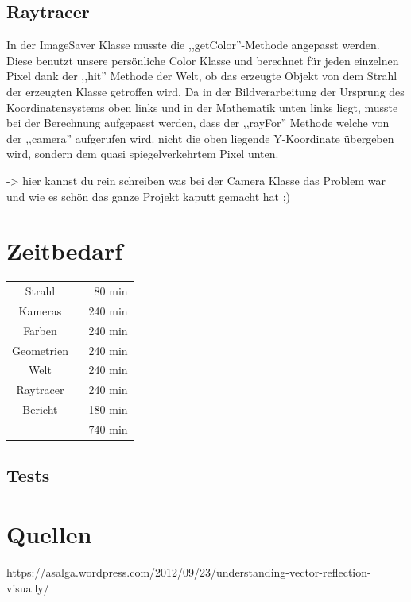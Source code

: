 \documentclass[14pt]{extarticle}
\begin{document}
\subsection{Raytracer}

In der ImageSaver Klasse musste die ,,getColor''-Methode angepasst werden. Diese benutzt unsere persönliche Color Klasse und berechnet für jeden einzelnen Pixel dank der ,,hit'' Methode der Welt, ob das erzeugte Objekt von dem Strahl der erzeugten Klasse getroffen wird. Da in der Bildverarbeitung der Ursprung des Koordinatensystems oben links und in der Mathematik unten links liegt, musste bei der Berechnung aufgepasst werden, dass der ,,rayFor'' Methode welche von der ,,camera'' aufgerufen wird. nicht die oben liegende Y-Koordinate übergeben wird, sondern dem quasi spiegelverkehrtem Pixel unten. 

-> hier kannst du rein schreiben was bei der Camera Klasse das Problem war und wie es schön das ganze Projekt kaputt gemacht hat ;) 



\section{Zeitbedarf}
\begin{center}
\begin{tabular}{cr}
Strahl	  \	&80 min	\\
Kameras 	\	&240 min	\\
Farben \	&240 min	\\
Geometrien \	&240 min	\\
Welt \	&240 min	\\
Raytracer \	&240 min	\\

Bericht  \		&180 min	 \\
	\hline
	&740 min
\end{tabular}
\end{center}

\subsection{Tests}

\section{Quellen}
https://asalga.wordpress.com/2012/09/23/understanding-vector-reflection-visually/
\end{document}
